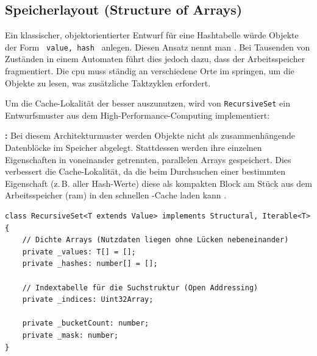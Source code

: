 
\subsection{Speicherlayout (Structure of Arrays)}
\label{subsec:rs-intern-speicherlayout}

Ein klassischer, objektorientierter Entwurf für eine Hashtabelle würde Objekte der Form \texttt{{ value, hash }} anlegen. Diesen Ansatz nennt man \textit{}. Bei Tausenden von Zuständen in einem Automaten führt dies jedoch dazu, dass der Arbeitsspeicher fragmentiert. Die \gls{cpu} muss ständig an verschiedene Orte im  springen, um die Objekte zu lesen, was zusätzliche Taktzyklen erfordert.

Um die Cache-Lokalität der  besser auszunutzen, wird von \texttt{RecursiveSet} ein Entwurfsmuster aus dem High-Performance-Computing implementiert:

\begin{definition}
\label{def:structure-of-arrays}
\textbf{:} Bei diesem Architekturmuster werden Objekte nicht als zusammenhängende Datenblöcke im Speicher abgelegt. Stattdessen werden ihre einzelnen Eigenschaften in voneinander getrennten, parallelen Arrays gespeichert. Dies verbessert die Cache-Lokalität, da die  beim Durchsuchen einer bestimmten Eigenschaft (z.\,B. aller Hash-Werte) diese als kompakten Block am Stück aus dem Arbeitsspeicher (\gls{ram}) in den schnellen -Cache laden kann \autocite[161]{fabian2018data}.
\end{definition}

\begin{listing}[ht]
    \caption{Speicherarchitektur im -Format}
    \label{lst:rs-soa-layout}
    \begin{verbatim}
class RecursiveSet<T extends Value> implements Structural, Iterable<T> {
    // Dichte Arrays (Nutzdaten liegen ohne Lücken nebeneinander)
    private _values: T[] = [];
    private _hashes: number[] = [];
    
    // Indextabelle für die Suchstruktur (Open Addressing)
    private _indices: Uint32Array;
    
    private _bucketCount: number;
    private _mask: number;
}
    \end{verbatim}
\end{listing}

